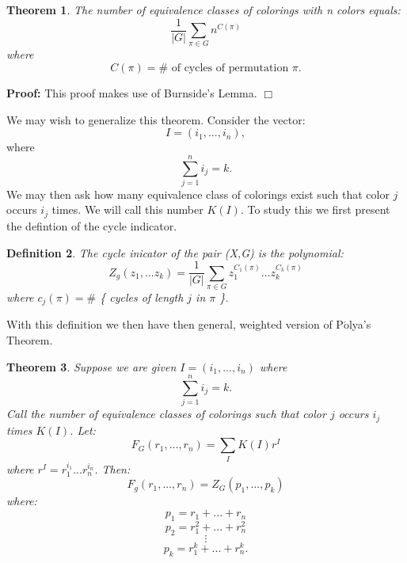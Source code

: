 \documentclass[11pt]{article}
\newtheorem{theorem}{Theorem}
\newtheorem{definition}[theorem]{Definition}
\newenvironment{proof}{\noindent \textbf{Proof:}}{$\Box$}
\begin{document}
\begin{theorem}
The number of equivalence classes of colorings with n colors equals:
	\[\frac{1}{|G|} \sum_{\pi \in G} {n^{C(\pi)}} \]
where
	\[ C(\pi) = \# \mbox{ of cycles of permutation } \pi .\]
\end{theorem}

\begin{proof}
This proof makes use of Burnside's Lemma.
\end{proof}

We may wish to generalize this theorem. Consider the vector:
	\[ I = (i_1,...,i_n), \]
where
	\[\sum_{j=1}^{n} i_j = k .\]
We may then ask how many equivalence class of colorings exist such that color $j$ occurs $i_j$ times. We will call this number $K(I)$. To study this we first present the defintion of the cycle indicator.

\begin{definition}
The cycle inicator of the pair (X,G) is the polynomial:
	\[Z_g(z_1,...z_k) = \frac{1}{|G|} \sum_{\pi \in G} {z_{1}^{C_1(\pi)} \hdots z_k^{C_k(\pi)}}\]
where $c_j(\pi) = \#$ \{ cycles of length $j$ in $\pi$ \}. 
\end{definition}

With this definition we then have then general, weighted version of P$\acute{\mbox{o}}$lya's Theorem.

\begin{theorem}
Suppose we are given $I=(i_1,...,i_n)$ where 
	\[\sum_{j=1}^{n} i_j = k.	\]
Call the number of equivalence classes of colorings such that color $j$ occurs $i_j$ times $K(I)$. Let:
	\[ F_G (r_1,...,r_n) = \sum_{I} K(I) r^I\]
where $r^I = r_1^{i_1}...r_n^{i_n}$. Then:
	\[ F_g (r_1,...,r_n) = Z_G (p_1,...,p_k)\]
where:
	\[p_1 = r_1 + ... + r_n \]
	\[p_2 = r_1^2 + ... + r_n^2 \]
	\[ \vdots \]
	\[p_k = r_1^k + ... + r_n^k. \]
\end{theorem}
\end{document}
